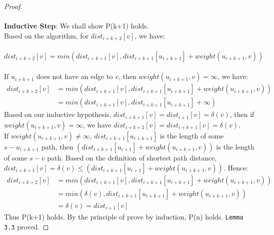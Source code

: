 \documentclass[11pt, oneside]{article}   	%
\newcommand\tab[1][1cm]{\hspace*{#1}}
\theoremstyle{definition}
\begin{document}
\begin{proof}
\\\\
\textbf{Inductive Step}: We shall show P(k+1) holds. 
\\
Based on the algorithm, for $dist_{i+k+2}[v]$, we have: 
\\\\
  \tab $dist_{i+k+2}[v] = min(dist_{i+k+1}[v], dist_{i+k+1}[u_{i+k+1}] + weight(u_{i+k+1}, v))$
\\\\
If $u_{i+k+1}$ does not have an edge to $v$, then $weight(u_{i+k+1}, v) = \infty$, we have: 
\begin{align*}
    dist_{i+k+2}[v] &= min(dist_{i+k+1}[v], dist_{i+k+1}[u_{i+k+1}] + weight(u_{i+k+1}, v)) \\
                    &= min(dist_{i+k+1}[v], dist_{i+k+1}[u_{i+k+1}] + \infty) 
\end{align*}
Based on our inductive hypothesis, $dist_{i+k+1}[v] = dist_{i+1}[v] = \delta(v)$, then if $weight(u_{i+k+1}, v) = \infty$, we have $dist_{i+k+2}[v] = dist_{i+k+1}[v] = \delta(v)$. 
\\
If $weight(u_{i+k+1}, v) \neq \infty$, $dist_{i+k+1}[u_{i+k+1}] $ is the length of some $s-u_{i+k+1}$ path, then $(dist_{i+k+1}[u_{i+1}] + weight(u_{i+k+1}, v))$ is the length of some $s-v$ path. Based on the definition of shortest path distance, $dist_{i+k+1}[v] = \delta(v) \leq (dist_{i+k+1}[u_{i+1}] + weight(u_{i+k+1}, v))$. Hence: 
\begin{align*}
  dist_{i+k+2}[v] &= min(dist_{i+k+1}[v], dist_{i+k+1}[u_{i+k+1}] + weight(u_{i+k+1}, v)) \\
                  &= min(\delta(v), dist_{i+k+1}[u_{i+k+1}] + weight(u_{i+k+1}, v))\\
                  &= \delta(v) = dist_{i+1}[v]
\end{align*}
Thus P(k+1) holds. By the principle of prove by induction, P(n) holds. \texttt{Lemma 3.3} proved. 
\end{proof}
\tab\\ 
\end{document}
